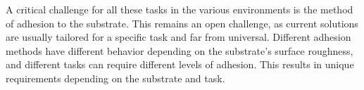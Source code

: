 

A critical challenge for all these tasks in the various environments is the method of adhesion to the substrate. This remains an open challenge, as current solutions are usually tailored for a specific task and far from universal.
Different adhesion methods have different behavior depending on the substrate's surface roughness, and different tasks can require different levels of adhesion. This results in unique requirements depending on the substrate and task.




